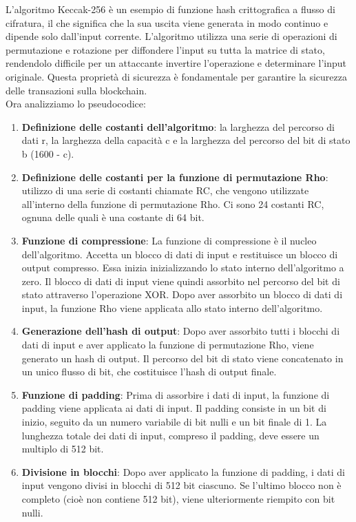 \documentclass[a4paper,11pt]{report}
\begin{document}
L'algoritmo Keccak-256 è un esempio di funzione hash crittografica a flusso di cifratura, il che significa che la sua uscita viene generata in modo continuo e dipende solo dall'input corrente. L'algoritmo utilizza una serie di operazioni di permutazione e rotazione per diffondere l'input su tutta la matrice di stato, rendendolo difficile per un attaccante invertire l'operazione e determinare l'input originale. Questa proprietà di sicurezza è fondamentale per garantire la sicurezza delle transazioni sulla blockchain.\\
Ora analizziamo lo pseudocodice:
\begin{enumerate}
    \item \textbf{Definizione delle costanti dell'algoritmo}: la larghezza del percorso di dati r, la larghezza della capacità c e la larghezza del percorso del bit di stato b (1600 - c).
    \item \textbf{Definizione delle costanti per la funzione di permutazione Rho}: utilizzo di una serie di costanti chiamate RC, che vengono utilizzate all'interno della funzione di permutazione Rho. Ci sono 24 costanti RC, ognuna delle quali è una costante di 64 bit.
    \item \textbf{Funzione di compressione}: La funzione di compressione è il nucleo dell'algoritmo. Accetta un blocco di dati di input e restituisce un blocco di output compresso. Essa inizia inizializzando lo stato interno dell'algoritmo a zero. Il blocco di dati di input viene quindi assorbito nel percorso del bit di stato attraverso l'operazione XOR. Dopo aver assorbito un blocco di dati di input, la funzione Rho viene applicata allo stato interno dell'algoritmo.
    \item \textbf{Generazione dell'hash di output}: Dopo aver assorbito tutti i blocchi di dati di input e aver applicato la funzione di permutazione Rho, viene generato un hash di output. Il percorso del bit di stato viene concatenato in un unico flusso di bit, che costituisce l'hash di output finale.
    \item \textbf{Funzione di padding}: Prima di assorbire i dati di input, la funzione di padding viene applicata ai dati di input. Il padding consiste in un bit di inizio, seguito da un numero variabile di bit nulli e un bit finale di 1. La lunghezza totale dei dati di input, compreso il padding, deve essere un multiplo di 512 bit.
    \item \textbf{Divisione in blocchi}: Dopo aver applicato la funzione di padding, i dati di input vengono divisi in blocchi di 512 bit ciascuno. Se l'ultimo blocco non è completo (cioè non contiene 512 bit), viene ulteriormente riempito con bit nulli.

\end{enumerate}
\end{document}
